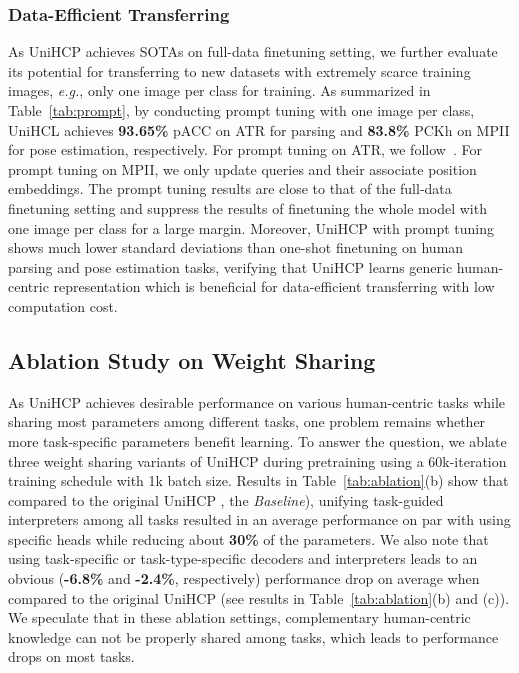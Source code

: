 \documentclass[10pt,twocolumn,letterpaper]{article}
\begin{document}
\subsubsection{Data-Efficient Transferring} \label{sec:data efficiency}


As UniHCP achieves SOTAs on full-data finetuning setting, we further evaluate its potential for transferring to new datasets with extremely scarce training images, \emph{e.g.}, only one image per class for training. As summarized in Table~\ref{tab:prompt}, by conducting prompt tuning with one image per class, UniHCL achieves \textbf{93.65\%} pACC on ATR for parsing and \textbf{83.8\%} PCKh on MPII for pose estimation, respectively. For prompt tuning on ATR, we follow~\cite{liu2021p}. For prompt tuning on MPII, we only update queries and their associate position embeddings.
The prompt tuning results are close to that of the full-data finetuning setting and suppress the results of finetuning the whole model with one image per class for a large margin. Moreover, UniHCP with prompt tuning shows much lower standard deviations than one-shot finetuning on human parsing and pose estimation tasks, verifying that UniHCP learns generic human-centric representation which 
is beneficial for data-efficient transferring with low computation cost.














\subsection{Ablation Study on Weight Sharing}
\label{sec:ablation}
As UniHCP achieves desirable performance on various human-centric tasks while sharing most parameters among different tasks, one problem remains whether more task-specific parameters benefit learning. To answer the question, we ablate three weight sharing variants of UniHCP during pretraining using a 60k-iteration training schedule with 1k batch size. Results in Table~\ref{tab:ablation}(b) show that compared to the original UniHCP \ie, the \textit{Baseline}), unifying task-guided interpreters among all tasks resulted in an average performance on par with using specific heads while reducing about \textbf{30\%} of the parameters.  
We also note that using task-specific or task-type-specific decoders and interpreters leads to an obvious (\textbf{-6.8\%} and \textbf{-2.4\%}, respectively) performance drop on average when compared to the original UniHCP (see results in Table~\ref{tab:ablation}(b) and (c)). We speculate that in these ablation settings, complementary human-centric knowledge can not be properly shared among tasks, which leads to performance drops on most tasks.
\end{document}
